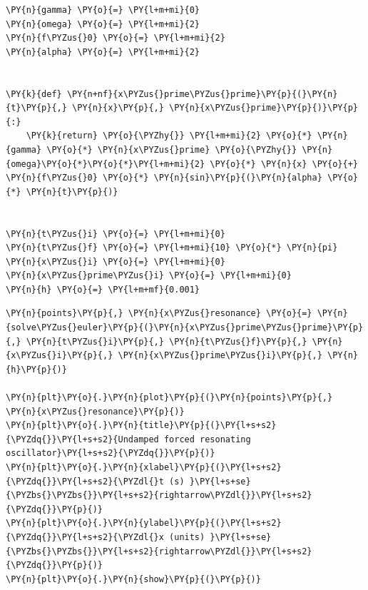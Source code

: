     \begin{tcolorbox}[breakable, size=fbox, boxrule=1pt, pad at break*=1mm,colback=cellbackground, colframe=cellborder]
\begin{Verbatim}[commandchars=\\\{\}]
\PY{n}{gamma} \PY{o}{=} \PY{l+m+mi}{0}
\PY{n}{omega} \PY{o}{=} \PY{l+m+mi}{2}
\PY{n}{f\PYZus{}0} \PY{o}{=} \PY{l+m+mi}{2}
\PY{n}{alpha} \PY{o}{=} \PY{l+m+mi}{2}


\PY{k}{def} \PY{n+nf}{x\PYZus{}prime\PYZus{}prime}\PY{p}{(}\PY{n}{t}\PY{p}{,} \PY{n}{x}\PY{p}{,} \PY{n}{x\PYZus{}prime}\PY{p}{)}\PY{p}{:}
    \PY{k}{return} \PY{o}{\PYZhy{}} \PY{l+m+mi}{2} \PY{o}{*} \PY{n}{gamma} \PY{o}{*} \PY{n}{x\PYZus{}prime} \PY{o}{\PYZhy{}} \PY{n}{omega}\PY{o}{*}\PY{o}{*}\PY{l+m+mi}{2} \PY{o}{*} \PY{n}{x} \PY{o}{+} \PY{n}{f\PYZus{}0} \PY{o}{*} \PY{n}{sin}\PY{p}{(}\PY{n}{alpha} \PY{o}{*} \PY{n}{t}\PY{p}{)}


\PY{n}{t\PYZus{}i} \PY{o}{=} \PY{l+m+mi}{0}
\PY{n}{t\PYZus{}f} \PY{o}{=} \PY{l+m+mi}{10} \PY{o}{*} \PY{n}{pi}
\PY{n}{x\PYZus{}i} \PY{o}{=} \PY{l+m+mi}{0}
\PY{n}{x\PYZus{}prime\PYZus{}i} \PY{o}{=} \PY{l+m+mi}{0}
\PY{n}{h} \PY{o}{=} \PY{l+m+mf}{0.001}
\end{Verbatim}
\end{tcolorbox}

    \begin{tcolorbox}[breakable, size=fbox, boxrule=1pt, pad at break*=1mm,colback=cellbackground, colframe=cellborder]
\begin{Verbatim}[commandchars=\\\{\}]
\PY{n}{points}\PY{p}{,} \PY{n}{x\PYZus{}resonance} \PY{o}{=} \PY{n}{solve\PYZus{}euler}\PY{p}{(}\PY{n}{x\PYZus{}prime\PYZus{}prime}\PY{p}{,} \PY{n}{t\PYZus{}i}\PY{p}{,} \PY{n}{t\PYZus{}f}\PY{p}{,} \PY{n}{x\PYZus{}i}\PY{p}{,} \PY{n}{x\PYZus{}prime\PYZus{}i}\PY{p}{,} \PY{n}{h}\PY{p}{)}

\PY{n}{plt}\PY{o}{.}\PY{n}{plot}\PY{p}{(}\PY{n}{points}\PY{p}{,} \PY{n}{x\PYZus{}resonance}\PY{p}{)}
\PY{n}{plt}\PY{o}{.}\PY{n}{title}\PY{p}{(}\PY{l+s+s2}{\PYZdq{}}\PY{l+s+s2}{Undamped forced resonating oscillator}\PY{l+s+s2}{\PYZdq{}}\PY{p}{)}
\PY{n}{plt}\PY{o}{.}\PY{n}{xlabel}\PY{p}{(}\PY{l+s+s2}{\PYZdq{}}\PY{l+s+s2}{\PYZdl{}t (s) }\PY{l+s+se}{\PYZbs{}\PYZbs{}}\PY{l+s+s2}{rightarrow\PYZdl{}}\PY{l+s+s2}{\PYZdq{}}\PY{p}{)}
\PY{n}{plt}\PY{o}{.}\PY{n}{ylabel}\PY{p}{(}\PY{l+s+s2}{\PYZdq{}}\PY{l+s+s2}{\PYZdl{}x (units) }\PY{l+s+se}{\PYZbs{}\PYZbs{}}\PY{l+s+s2}{rightarrow\PYZdl{}}\PY{l+s+s2}{\PYZdq{}}\PY{p}{)}
\PY{n}{plt}\PY{o}{.}\PY{n}{show}\PY{p}{(}\PY{p}{)}
\end{Verbatim}
\end{tcolorbox}

